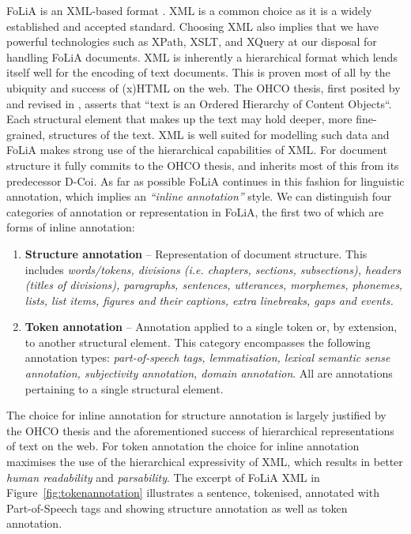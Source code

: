 \documentclass[a4paper,10pt,twoside]{article}
\begin{document}
FoLiA is an XML-based format \cite{XML}. XML is a common choice as it is a
widely established and accepted standard. Choosing XML also implies that we
have powerful technologies such as XPath, XSLT, and XQuery at our disposal for
handling FoLiA documents. XML is inherently a hierarchical format which lends
itself well for the encoding of text documents. This is proven most of all by
the ubiquity and success of (x)HTML on the web.  The OHCO thesis, first posited
by  and revised in , asserts that ``text is an Ordered
Hierarchy of Content Objects``. Each structural element that makes up the text
may hold deeper, more fine-grained, structures of the text. XML is well suited
for modelling such data and FoLiA makes strong use of the hierarchical
capabilities of XML. For document structure it fully commits to the OHCO
thesis, and inherits most of this from its predecessor D-Coi. As far as
possible FoLiA continues in this fashion for linguistic annotation, which
implies an \emph{``inline annotation''} style. We can distinguish four categories of
annotation or representation in FoLiA, the first two of which are forms of
inline annotation:

\begin{enumerate}
\item \textbf{Structure annotation} -- Representation of document structure.
  This includes \emph{words/tokens, divisions (i.e. chapters, sections,
  subsections), headers (titles of divisions), paragraphs, sentences,
  utterances, morphemes,
  phonemes, lists,
  list items, figures and their captions, extra linebreaks, gaps and events.}
\item \textbf{Token annotation} -- Annotation applied to a single token or, by
  extension, to another structural element. This category encompasses the
  following annotation types: \emph{part-of-speech tags, lemmatisation, lexical
  semantic sense annotation, subjectivity annotation, domain annotation}. All
  are annotations pertaining to a single structural element.
  \setcounter{enumTemptwo}{\theenumi}
\end{enumerate}

The choice for inline annotation for structure annotation is largely justified
by the OHCO thesis and the aforementioned success of hierarchical representations of text on
the web. For token annotation the choice for inline annotation maximises the
use of the hierarchical expressivity of XML, which results in better \emph{human
readability} and \emph{parsability}. The excerpt of FoLiA XML in
Figure~\ref{fig:tokenannotation} illustrates a sentence, tokenised, annotated with
Part-of-Speech tags and showing structure annotation as well as token annotation.
\end{document}
